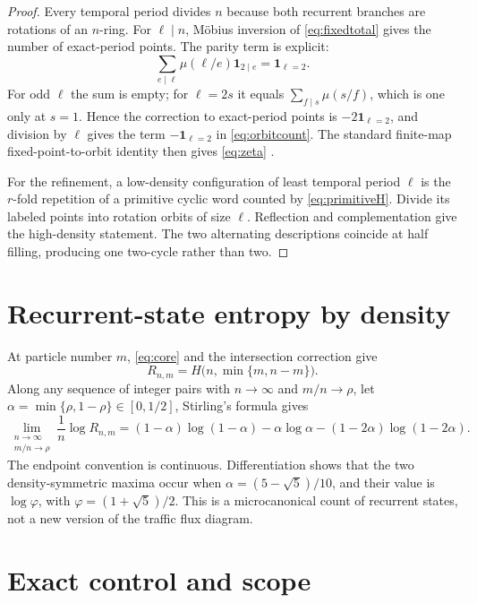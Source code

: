 \documentclass[11pt,a4paper]{amsart}
\theoremstyle{definition}
\theoremstyle{remark}
\newcommand{\1}{\mathbf 1}
\begin{document}
\begin{proof}
Every temporal period divides $n$ because both recurrent branches are
rotations of an $n$-ring.  For $\ell\mid n$, M\"obius inversion of
\eqref{eq:fixedtotal} gives the number of exact-period points.  The parity
term is explicit:
\[
 \sum_{e\mid\ell}\mu(\ell/e)\1_{2\mid e}=\1_{\ell=2}.
\]
For odd $\ell$ the sum is empty; for $\ell=2s$ it equals
$\sum_{f\mid s}\mu(s/f)$, which is one only at $s=1$.  Hence the correction
to exact-period points is $-2\1_{\ell=2}$, and division by $\ell$ gives the
term $-\1_{\ell=2}$ in \eqref{eq:orbitcount}.  The standard finite-map
fixed-point-to-orbit identity then gives \eqref{eq:zeta}
\cite{LindMarcus1995}.

For the refinement, a low-density configuration of least temporal period
$\ell$ is the $r$-fold repetition of a primitive cyclic word counted by
\eqref{eq:primitiveH}.  Divide its labeled points into rotation orbits of
size $\ell$.  Reflection and complementation give the high-density statement.
The two alternating descriptions coincide at half filling, producing one
two-cycle rather than two.
\end{proof}

\section{Recurrent-state entropy by density}

At particle number $m$, \eqref{eq:core} and the intersection correction give
\[
 R_{n,m}=H\bigl(n,\min\{m,n-m\}\bigr).
\]
Along any sequence of integer pairs with $n\to\infty$ and $m/n\to\rho$, let
$\alpha=\min\{\rho,1-\rho\}\in[0,1/2]$, Stirling's formula gives
\begin{equation}\label{eq:microentropy}
 \lim_{\substack{n\to\infty\\ m/n\to\rho}}
 \frac1n\log R_{n,m}
 =(1-\alpha)\log(1-\alpha)-\alpha\log\alpha
  -(1-2\alpha)\log(1-2\alpha).
\end{equation}
The endpoint convention is continuous.  Differentiation shows that the two
density-symmetric maxima occur when
$\alpha=(5-\sqrt5)/10$, and their value is $\log\varphi$, with
$\varphi=(1+\sqrt5)/2$.  This is a microcanonical count of recurrent states,
not a new version of the traffic flux diagram.

\section{Exact control and scope}
\end{document}
